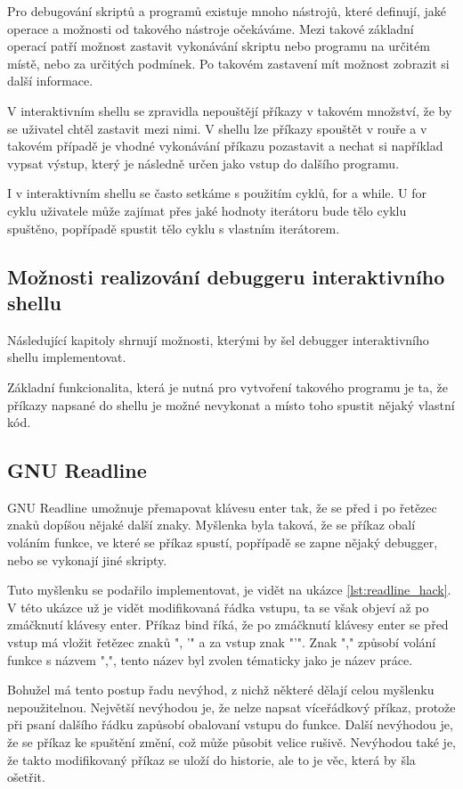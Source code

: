 \documentclass[thesis=M,czech]{FITthesis}[2012/06/26]
\begin{document}
Pro debugování skriptů a programů existuje mnoho nástrojů, které definují, jaké operace a možnosti od takového nástroje očekáváme. Mezi takové základní operací patří možnost zastavit vykonávání skriptu nebo programu na určitém místě, nebo za určitých podmínek. Po takovém zastavení mít možnost zobrazit si další informace.

V interaktivním shellu se zpravidla nepouštějí příkazy v takovém množství, že by se uživatel chtěl zastavit mezi nimi. V shellu lze příkazy spouštět v rouře a v takovém případě je vhodné vykonávání příkazu pozastavit a nechat si například vypsat výstup, který je následně určen jako vstup do dalšího programu.

I v interaktivním shellu se často setkáme s použitím cyklů, for a while. U for cyklu uživatele může zajímat přes jaké hodnoty iterátoru bude tělo cyklu spuštěno, popřípadě spustit tělo cyklu s vlastním iterátorem.




\subsection{Možnosti realizování debuggeru interaktivního shellu}

Následující kapitoly shrnují možnosti, kterými by šel debugger interaktivního shellu implementovat.

Základní funkcionalita, která je nutná pro vytvoření takového programu je ta, že příkazy napsané do shellu je možné nevykonat a místo toho spustit nějaký vlastní kód.

\subsection{GNU Readline}

GNU Readline umožnuje přemapovat klávesu enter tak, že se před i po řetězec znaků dopíšou nějaké další znaky. Myšlenka byla taková, že se příkaz obalí voláním funkce, ve které se příkaz spustí, popřípadě se zapne nějaký debugger, nebo se vykonají jiné skripty.

Tuto myšlenku se podařilo implementovat, je vidět na ukázce \ref{lst:readline_hack}. V této ukázce už je vidět modifikovaná řádka vstupu, ta se však objeví až po zmáčknutí klávesy enter. Příkaz bind říká, že po zmáčknutí klávesy enter se před vstup má vložit řetězec znaků ", '" a za vstup znak "'". Znak "," způsobí volání funkce s názvem ",", tento název byl zvolen tématicky jako je název práce.

Bohužel má tento postup řadu nevýhod, z nichž některé dělají celou myšlenku nepoužitelnou. Největší nevýhodou je, že nelze napsat víceřádkový příkaz, protože při psaní dalšího řádku zapůsobí obalovaní vstupu do funkce. Další nevýhodou je, že se příkaz ke spuštění změní, což může působit velice rušivě. Nevýhodou také je, že takto modifikovaný příkaz se uloží do historie, ale to je věc, která by šla ošetřit.
\end{document}
